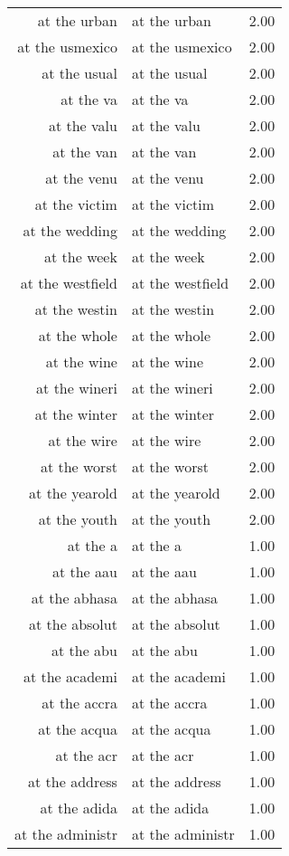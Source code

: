 \begin{table}[ht]
\begin{tabular}{rlr}
  at the urban & at the urban & 2.00 \\ 
  at the usmexico & at the usmexico & 2.00 \\ 
  at the usual & at the usual & 2.00 \\ 
  at the va & at the va & 2.00 \\ 
  at the valu & at the valu & 2.00 \\ 
  at the van & at the van & 2.00 \\ 
  at the venu & at the venu & 2.00 \\ 
  at the victim & at the victim & 2.00 \\ 
  at the wedding & at the wedding & 2.00 \\ 
  at the week & at the week & 2.00 \\ 
  at the westfield & at the westfield & 2.00 \\ 
  at the westin & at the westin & 2.00 \\ 
  at the whole & at the whole & 2.00 \\ 
  at the wine & at the wine & 2.00 \\ 
  at the wineri & at the wineri & 2.00 \\ 
  at the winter & at the winter & 2.00 \\ 
  at the wire & at the wire & 2.00 \\ 
  at the worst & at the worst & 2.00 \\ 
  at the yearold & at the yearold & 2.00 \\ 
  at the youth & at the youth & 2.00 \\ 
  at the a & at the a & 1.00 \\ 
  at the aau & at the aau & 1.00 \\ 
  at the abhasa & at the abhasa & 1.00 \\ 
  at the absolut & at the absolut & 1.00 \\ 
  at the abu & at the abu & 1.00 \\ 
  at the academi & at the academi & 1.00 \\ 
  at the accra & at the accra & 1.00 \\ 
  at the acqua & at the acqua & 1.00 \\ 
  at the acr & at the acr & 1.00 \\ 
  at the address & at the address & 1.00 \\ 
  at the adida & at the adida & 1.00 \\ 
  at the administr & at the administr & 1.00 \\ 

\end{tabular}
\end{table}
